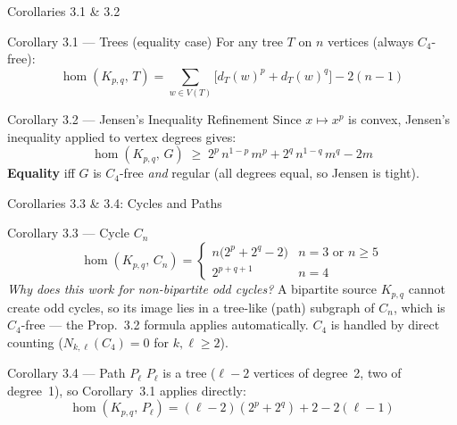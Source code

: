 \documentclass[10pt]{beamer}
\begin{document}
\begin{frame}{Corollaries 3.1 \& 3.2}
  \begin{block}{Corollary 3.1 --- Trees (equality case)}
    For any tree $T$ on $n$ vertices (always $C_4$-free):
    \[
      \hom(K_{p,q},\,T) = \sum_{w \in V(T)} \bigl[d_T(w)^p + d_T(w)^q\bigr] - 2(n-1)
    \]
  \end{block}

  \begin{block}{Corollary 3.2 --- Jensen's Inequality Refinement}
    Since $x \mapsto x^p$ is convex, Jensen's inequality applied to vertex degrees gives:
    \[
      \hom(K_{p,q},\,G) \;\geq\; 2^p\,n^{1-p}\,m^p + 2^q\,n^{1-q}\,m^q - 2m
    \]
    \textbf{Equality} iff $G$ is $C_4$-free \emph{and} regular (all degrees equal, so Jensen is tight).
  \end{block}
\end{frame}

\begin{frame}{Corollaries 3.3 \& 3.4: Cycles and Paths}
  \begin{block}{Corollary 3.3 --- Cycle $C_n$}
    \[
      \hom(K_{p,q},\,C_n) = \begin{cases}
        n\bigl(2^p + 2^q - 2\bigr) & n = 3 \text{ or } n \geq 5 \\
        2^{p+q+1} & n = 4
      \end{cases}
    \]
    \textit{Why does this work for non-bipartite odd cycles?}
    A bipartite source $K_{p,q}$ cannot create odd cycles, so its image lies in a tree-like (path) subgraph of $C_n$, which is $C_4$-free --- the Prop.\ 3.2 formula applies automatically.
    $C_4$ is handled by direct counting ($N_{k,\ell}(C_4) = 0$ for $k,\ell \geq 2$).
  \end{block}

  \begin{block}{Corollary 3.4 --- Path $P_\ell$}
    $P_\ell$ is a tree ($\ell - 2$ vertices of degree~2, two of degree~1), so Corollary~3.1 applies directly:
    \[
      \hom(K_{p,q},\,P_\ell) = (\ell-2)(2^p+2^q) + 2 - 2(\ell-1)
    \]
  \end{block}
\end{frame}
\end{document}
